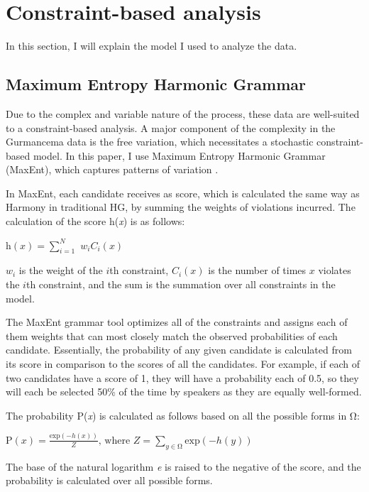 \documentclass[output=paper,newtxmath,modfonts,nonflat,draftmode]{langsci/langscibook}
\begin{document}
\section{Constraint-based analysis}\label{sec:baird:5}
In this section, I will explain the model I used to analyze the data. 

\subsection{Maximum Entropy Harmonic Grammar}

Due to the complex and variable nature of the process, these data are well-suited to a constraint-based analysis. A major component of the complexity in the Gurmancema data is the free variation, which necessitates a stochastic constraint-based model. In this paper, I use Maximum Entropy Harmonic Grammar (MaxEnt), which captures patterns of variation \citep{GoldwaterJohnson2003,HayesWilson2008}. 
	 
In MaxEnt, each candidate receives as score, which is calculated the same way as Harmony in traditional HG, by summing the weights of violations incurred. The calculation of the score h(\textit{x}) is as follows: 

\ea
$ \mathrm{h}(x) = \sum_{\textit{i}=1}^{\textit{N}}$ ${w_i}{C_i}(x)$
\z

${w_i}$ is the weight of the $i$th constraint, ${C_i}(x)$ is the number of times $x$ violates the $i$th constraint, and the sum is the summation over all constraints in the model.  

The MaxEnt grammar tool \citep{WilsonHayesGeorge2008} optimizes all of the constraints and assigns each of them weights that can most closely match the observed probabilities of each candidate. Essentially, the probability of any given candidate is calculated from its score in comparison to the scores of all the candidates. For example, if each of two candidates have a score of 1, they will have a probability each of 0.5, so they will each be selected 50\% of the time by speakers as they are equally well-formed.

The probability P(\textit{x}) is calculated as follows based on all the possible forms in Ω:

\ea 
$ \mathrm{P}(x) = \frac{\mathrm{exp}(-h(x))}{Z}\text{, where } Z = \sum_{y\in \mathrm{Ω}} \mathrm{exp}(-h(y))$  
\z

The base of the natural logarithm \textit{e} is raised to the negative of the score, and the probability is calculated over all possible forms. 
\end{document}
